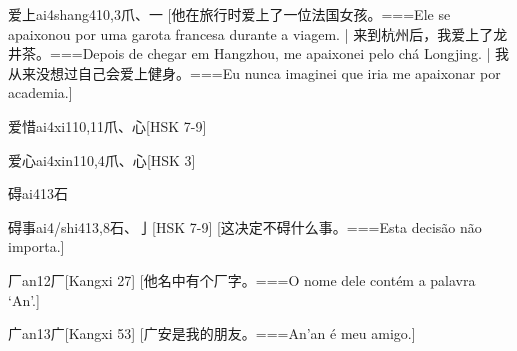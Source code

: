 \begin{EntryWithPhonetic}{爱上}{ai4shang4}{10,3}{⽖、⼀}
  [他在旅行时爱上了一位法国女孩。===Ele se apaixonou por uma garota francesa durante a viagem.  | 来到杭州后，我爱上了龙井茶。===Depois de chegar em Hangzhou, me apaixonei pelo chá Longjing. | 我从来没想过自己会爱上健身。===Eu nunca imaginei que iria me apaixonar por academia.]
\end{EntryWithPhonetic}

\begin{EntryWithPhonetic}{爱惜}{ai4xi1}{10,11}{⽖、⼼}[HSK 7-9]
\end{EntryWithPhonetic}

\begin{EntryWithPhonetic}{爱心}{ai4xin1}{10,4}{⽖、⼼}[HSK 3]
\end{EntryWithPhonetic}

\begin{EntryWithPhonetic}{碍}{ai4}{13}{⽯}
\end{EntryWithPhonetic}

\begin{EntryWithPhonetic}{碍事}{ai4/shi4}{13,8}{⽯、⼅}[HSK 7-9]
  [这决定不碍什么事。===Esta decisão não importa.]
\end{EntryWithPhonetic}

\begin{EntryWithPhonetic}{厂}{an1}{2}{⼚}[Kangxi 27]
  [他名中有个厂字。===O nome dele contém a palavra `An'.]
\end{EntryWithPhonetic}

\begin{EntryWithPhonetic}{广}{an1}{3}{⼴}[Kangxi 53]
  [广安是我的朋友。===An'an é meu amigo.]
\end{EntryWithPhonetic}

